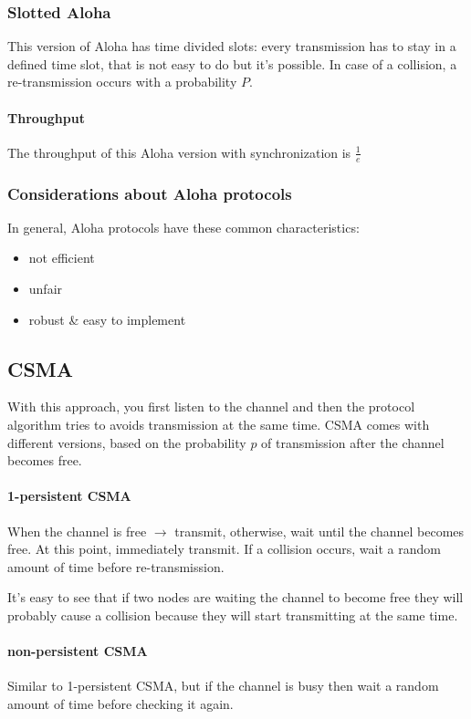 \subsubsection{Slotted Aloha}

This version of Aloha has time divided slots: every transmission has to stay in
a defined time slot, that is not easy to do but it's possible. In case of a
collision, a re-transmission occurs with a probability $P$.

\paragraph*{Throughput} The throughput of this Aloha version with
synchronization is $\frac{1}{e}$

\subsubsection{Considerations about Aloha protocols}

In general, Aloha protocols have these common characteristics:
\begin{itemize}
\item not efficient
\item unfair
\item robust \& easy to implement
\end{itemize}

\subsection{CSMA}

With this approach, you first listen to the channel and then the protocol
algorithm tries to avoids transmission at the same time. CSMA comes with
different versions, based on the probability $p$ of transmission after the
channel becomes free.

\paragraph*{1-persistent CSMA} When the channel is free $\to$ transmit,
otherwise, wait until the channel becomes free. At this point, immediately
transmit. If a collision occurs, wait a random amount of time before
re-transmission.

It's easy to see that if two nodes are waiting the channel to become free they
will probably cause a collision because they will start transmitting at the
same time.

\paragraph*{non-persistent CSMA} Similar to 1-persistent CSMA, but if the
channel is busy then wait a random amount of time before checking it again.

